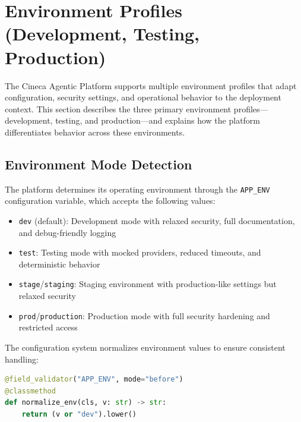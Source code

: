 
\section{Environment Profiles (Development, Testing, Production)}
\label{sec:env-profiles}

The Cineca Agentic Platform supports multiple environment profiles that adapt configuration, security settings, and operational behavior to the deployment context. This section describes the three primary environment profiles---development, testing, and production---and explains how the platform differentiates behavior across these environments.

\subsection{Environment Mode Detection}

The platform determines its operating environment through the \texttt{APP\_ENV} configuration variable, which accepts the following values:

\begin{itemize}
    \item \texttt{dev} (default): Development mode with relaxed security, full documentation, and debug-friendly logging
    \item \texttt{test}: Testing mode with mocked providers, reduced timeouts, and deterministic behavior
    \item \texttt{stage}/\texttt{staging}: Staging environment with production-like settings but relaxed security
    \item \texttt{prod}/\texttt{production}: Production mode with full security hardening and restricted access
\end{itemize}

The configuration system normalizes environment values to ensure consistent handling:

\begin{lstlisting}[language=Python, caption=Environment normalization in src/config.py]
@field_validator("APP_ENV", mode="before")
@classmethod
def normalize_env(cls, v: str) -> str:
    return (v or "dev").lower()
\end{lstlisting}

